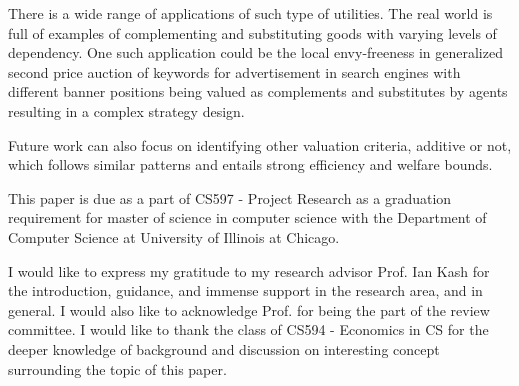There is a wide range of applications of such type of utilities. The real world is full of examples of complementing and substituting goods with varying levels of dependency. One such application could be the local envy-freeness in generalized second price auction of keywords for advertisement in search engines \cite{edelman2007internet} with different banner positions being valued as complements and substitutes by agents resulting in a complex strategy design. 

Future work can also focus on identifying other valuation criteria, additive or not, which follows similar patterns and entails strong efficiency and welfare bounds.


\begin{acks}
This paper is due as a part of CS597 - Project Research as a graduation requirement for master of science in computer science with the Department of Computer Science at University of Illinois at Chicago.

I would like to express my gratitude to my research advisor Prof. Ian Kash for the introduction, guidance, and immense support in the research area, and in general. I would also like to acknowledge Prof.           for being the part of the review committee. I would like to thank the class of CS594 - Economics in CS for the deeper knowledge of background and discussion on interesting concept surrounding the topic of this paper.


\end{acks}